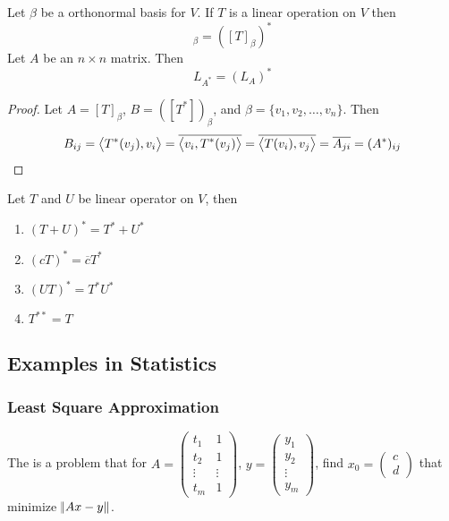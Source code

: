 \begin{theorem}
    Let $\beta$ be a orthonormal basis for $V$. If $T$ is a linear operation on $V$ then
    \begin{equation}
        [T^*]_\beta = ([T]_\beta)^*
    \end{equation}
    Let $A$ be an $n \times n$ matrix. Then
    \begin{equation}
        L_{A^*} = (L_A)^*
    \end{equation}
\end{theorem}
\begin{proof}
    Let $A=[T]_\beta$, $B=([T^*])_\beta$, and $\beta=\{v_1, v_2, \dots, v_n \}$. Then
    \begin{equation*}
        B_{ij} = \left\langle \displaystyle T^*(v_j), v_i \right\rangle = \overline{\left\langle \displaystyle v_i, T^*(v_j) \right\rangle} = \overline{\left\langle \displaystyle T(v_i), v_j \right\rangle} = \overline{A_{ji}} = (A^*)_{ij}
    \end{equation*}
\end{proof}

\begin{theorem}
    Let $T$ and $U$ be linear operator on $V$, then
    \begin{enumerate}
        \item $(T+U)^* = T^* + U^*$
        \item $(cT)^* = \overline{c} T^*$
        \item $(UT)^* = T^* U^*$
        \item $T^{**} = T$
    \end{enumerate}    
\end{theorem}


\subsection{Examples in Statistics}

\subsubsection{Least Square Approximation}


\begin{definition}
    The  is a problem that for $A = \begin{pmatrix}
        t_1 & 1 \\
        t_2 & 1 \\
        \vdots & \vdots \\
        t_m & 1
    \end{pmatrix}$,  $y = \begin{pmatrix}
        y_1\\
        y_2\\
        \vdots\\
        y_m
    \end{pmatrix}$, find $x_0 = \begin{pmatrix}
        c \\
        d
    \end{pmatrix}$ that minimize $\norm{Ax-y}$.
\end{definition}

